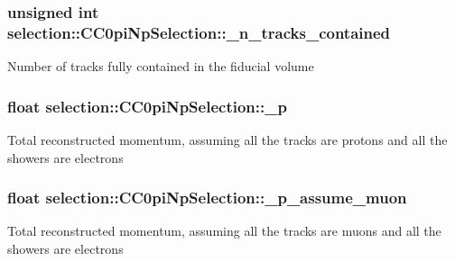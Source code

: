 \subsubsection[{\texorpdfstring{\+\_\+n\+\_\+tracks\+\_\+contained}{_n_tracks_contained}}]{\setlength{\rightskip}{0pt plus 5cm}unsigned int selection\+::\+C\+C0pi\+Np\+Selection\+::\+\_\+n\+\_\+tracks\+\_\+contained\hspace{0.3cm}{\ttfamily [private]}}\hypertarget{classselection_1_1CC0piNpSelection_a22c5cd4cf8882fa3cbabf25ed86d1f39}{}\label{classselection_1_1CC0piNpSelection_a22c5cd4cf8882fa3cbabf25ed86d1f39}
Number of tracks fully contained in the fiducial volume 
\subsubsection[{\texorpdfstring{\+\_\+p}{_p}}]{\setlength{\rightskip}{0pt plus 5cm}float selection\+::\+C\+C0pi\+Np\+Selection\+::\+\_\+p\hspace{0.3cm}{\ttfamily [private]}}\hypertarget{classselection_1_1CC0piNpSelection_afae64b232d6b3526032b289c91b092cb}{}\label{classselection_1_1CC0piNpSelection_afae64b232d6b3526032b289c91b092cb}
Total reconstructed momentum, assuming all the tracks are protons and all the showers are electrons 
\subsubsection[{\texorpdfstring{\+\_\+p\+\_\+assume\+\_\+muon}{_p_assume_muon}}]{\setlength{\rightskip}{0pt plus 5cm}float selection\+::\+C\+C0pi\+Np\+Selection\+::\+\_\+p\+\_\+assume\+\_\+muon\hspace{0.3cm}{\ttfamily [private]}}\hypertarget{classselection_1_1CC0piNpSelection_a2e861bf5b394c18e24f58d9fef5c33a5}{}\label{classselection_1_1CC0piNpSelection_a2e861bf5b394c18e24f58d9fef5c33a5}
Total reconstructed momentum, assuming all the tracks are muons and all the showers are electrons 
